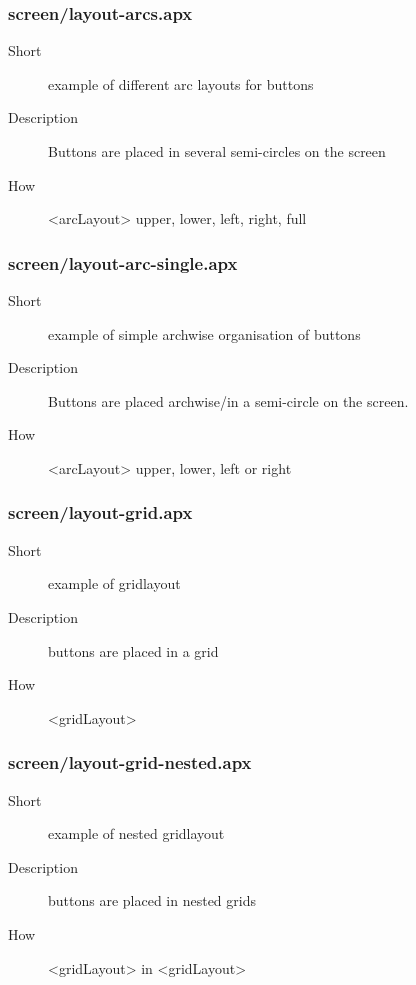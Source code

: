 \subsubsection{screen/layout-arcs.apx}
\begin{description}
\item[Short] 
 example of different arc layouts for buttons
\item[Description] 
 Buttons are placed in several semi-circles on the screen
\item[How] 
 \textless{}arcLayout\textgreater{} upper, lower, left, right, full
\end{description}

\subsubsection{screen/layout-arc-single.apx}
\begin{description}
\item[Short] 
 example of simple archwise organisation of buttons
\item[Description] 
 Buttons are placed archwise/in a semi-circle on the screen.
\item[How] 
 \textless{}arcLayout\textgreater{} upper, lower, left or right
\end{description}

\subsubsection{screen/layout-grid.apx}
\begin{description}
\item[Short] 
 example of gridlayout
\item[Description] 
 buttons are placed in a grid
\item[How] 
 \textless{}gridLayout\textgreater{}
\end{description}

\subsubsection{screen/layout-grid-nested.apx}
\begin{description}
\item[Short] 
 example of nested gridlayout
\item[Description] 
 buttons are placed in nested grids
\item[How] 
 \textless{}gridLayout\textgreater{} in \textless{}gridLayout\textgreater{}
\end{description}

